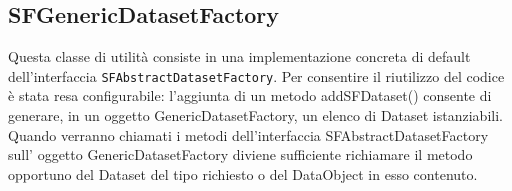 \subsection{SFGenericDatasetFactory}
\label{sub:sfgenericdatasetfactory}
Questa classe di utilit\`a consiste in una implementazione concreta di default dell'interfaccia \texttt{SFAbstractDatasetFactory}.
Per consentire il riutilizzo del codice \`e stata resa configurabile: l'aggiunta di un metodo addSFDataset() consente di generare, in un oggetto GenericDatasetFactory, un elenco di Dataset istanziabili.
Quando verranno chiamati i metodi dell'interfaccia SFAbstractDatasetFactory sull' oggetto GenericDatasetFactory diviene sufficiente richiamare il metodo opportuno del Dataset del tipo richiesto o del DataObject in esso contenuto.